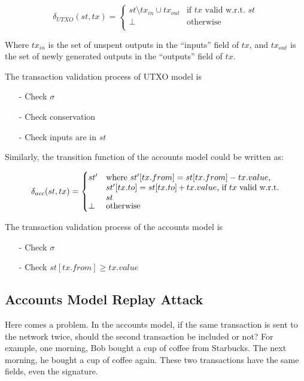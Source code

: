 \begin{equation}
    \delta_{UTXO} (st,tx) =
        \begin{cases}
        st \setminus tx_{in} \cup tx_{out}  & \text{if $tx$ valid w.r.t. $st$} \\
        \perp & \text{otherwise} \\
        \end{cases}
\end{equation}

Where $tx_{in}$ is the set of unspent outputs in the ``inputs'' field of $tx$, and $tx_{out}$ is the set of newly generated outputs in the ``outputs'' field of $tx$.

The transaction validation process of UTXO model is
\begin{itemize}
    \item[-] Check $\sigma$
    \item[-] Check conservation
    \item[-] Check inputs are in $st$
\end{itemize}

Similarly, the transition function of the accounts model could be written as:

\begin{equation}
    \delta_{acc} (st,tx) =
        \begin{cases}
        st' & \parbox[t]{.6\textwidth}{where $st' [tx.from] = st [tx.from] - tx.value$, \\
        $st' [tx.to] = st [tx.to] + tx.value$, if $tx$ valid w.r.t. $st$} \\
        \perp & \text{otherwise} \\
        \end{cases}
\end{equation}

The transaction validation process of the accounts model is
\begin{itemize}
    \item[-] Check $\sigma$
    \item[-] Check $st [tx.from] \geq tx.value$
\end{itemize}

\subsection{Accounts Model Replay Attack}

Here comes a problem. In the accounts model, if the same transaction is sent to the network twice, should the second transaction be included or not? For example, one morning, Bob bought a cup of coffee from Starbucks. The next morning, he bought a cup of coffee again. These two transactions have the same fields, even the signature.

